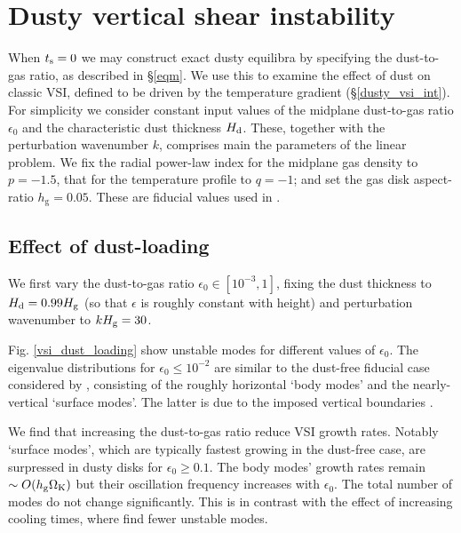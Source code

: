 \section{
  Dusty vertical shear instability}\label{results} 

When $t_\mathrm{s}=0$ we may construct exact dusty equilibra by specifying
the dust-to-gas ratio, as described in \S\ref{eqm}. We use this to
examine the effect of dust on classic VSI, defined to be driven by the
temperature gradient (\S\ref{dusty_vsi_int}). For simplicity we
consider constant input values of the midplane dust-to-gas ratio
$\epsilon_0$ and the characteristic dust thickness $H_\mathrm{d}$. These,
together with the perturbation wavenumber $k$, comprises main the
parameters of the linear problem. We fix the radial power-law index
for the midplane gas density to $p = -1.5$, that for the
temperature profile to $q=-1$; and set the gas disk aspect-ratio
$h_\mathrm{g}=0.05$. These are fiducial values used in . 

\subsection{Effect of dust-loading}
We first vary the dust-to-gas ratio $\epsilon_0\in[10^{-3},1]$,
fixing the dust thickness to $H_\mathrm{d}=0.99H_\mathrm{g}$ (so that $\epsilon$ is
roughly constant with height) and perturbation
wavenumber to $kH_\mathrm{g} = 30$. 

Fig. \ref{vsi_dust_loading} show unstable
modes for different values of $\epsilon_0$. The eigenvalue
distributions for $\epsilon_0 \leq 10^{-2}$ are similar to the
dust-free fiducial case considered by , consisting
of the roughly horizontal `body modes' and the nearly-vertical
`surface modes'. The latter is due to the imposed vertical boundaries
\citep{barker15}.  

We find that increasing the dust-to-gas ratio reduce VSI growth
rates. Notably `surface modes', which are typically fastest growing in
the dust-free case, are surpressed in dusty disks for $\epsilon_0\geq
0.1$. The body modes' growth rates remain $\sim O(h_\mathrm{g}\Omega_{\rm K})$
but their oscillation frequency increases with
$\epsilon_0$. The total number of modes do not change
significantly. This is in contrast with the effect of increasing
cooling times, where  find fewer unstable modes.

